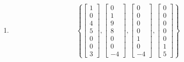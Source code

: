 \documentclass{article}
\begin{document}
\begin{enumerate}[label = \textbf{ basis $ W_\arabic*^\perp $: }]
\begin{align*}
				\begin{bmatrix} 0 \\ 0 \\ 0 \\ 0 \\ 0 \\ 1 \\ 5 \end{bmatrix}
			\right\}
		\end{align*}
	\item
		\begin{align*}
			\left\{
				\begin{bmatrix} 1 \\ 0 \\ 4 \\ 5 \\ 0 \\ 0 \\ 3 \end{bmatrix},
				\begin{bmatrix} 0 \\ 1 \\ 9 \\ 8 \\ 0 \\ 0 \\ -4 \end{bmatrix},
				\begin{bmatrix} 0 \\ 0 \\ 0 \\ 0 \\ 1 \\ 0 \\ -4 \end{bmatrix},
				\begin{bmatrix} 0 \\ 0 \\ 0 \\ 0 \\ 0 \\ 1 \\ 5 \end{bmatrix}
			\right\}
		\end{align*}
\end{enumerate}
\end{document}
